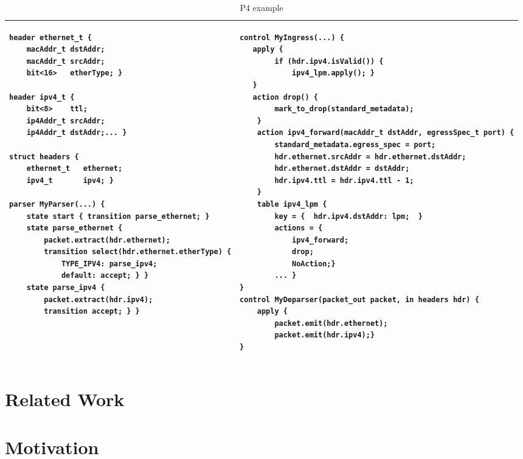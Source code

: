 \documentclass[sigconf]{acmart}
\begin{document}
\begin{table*}
\begin{tabular}{|p{8.4cm}|p{8.4cm}|}
\hline
\begin{lstlisting}[basicstyle=\scriptsize]
header ethernet_t {
    macAddr_t dstAddr;
    macAddr_t srcAddr;
    bit<16>   etherType; }
    
header ipv4_t {
    bit<8>    ttl;
    ip4Addr_t srcAddr;
    ip4Addr_t dstAddr;... }
    
struct headers {
    ethernet_t   ethernet;
    ipv4_t       ipv4; }

parser MyParser(...) {
    state start { transition parse_ethernet; }
    state parse_ethernet {
        packet.extract(hdr.ethernet);
        transition select(hdr.ethernet.etherType) {
            TYPE_IPV4: parse_ipv4;
            default: accept; } }
    state parse_ipv4 {
        packet.extract(hdr.ipv4);
        transition accept; } }
\end{lstlisting}
&
\begin{lstlisting}[basicstyle=\scriptsize]
control MyIngress(...) {
   apply {
        if (hdr.ipv4.isValid()) {
            ipv4_lpm.apply(); }
   }         
   action drop() {
        mark_to_drop(standard_metadata);
    }    
    action ipv4_forward(macAddr_t dstAddr, egressSpec_t port) {
        standard_metadata.egress_spec = port;
        hdr.ethernet.srcAddr = hdr.ethernet.dstAddr;
        hdr.ethernet.dstAddr = dstAddr;
        hdr.ipv4.ttl = hdr.ipv4.ttl - 1;
    }    
    table ipv4_lpm {
        key = {  hdr.ipv4.dstAddr: lpm;  }
        actions = {
            ipv4_forward;
            drop;
            NoAction;}
        ... }   
}
control MyDeparser(packet_out packet, in headers hdr) {
    apply {
        packet.emit(hdr.ethernet);
        packet.emit(hdr.ipv4);}
}
\end{lstlisting}\\
\hline
\end{tabular}
\caption{P4 example}
  \label{code:P4}
\end{table*}	   


	
	\section{Related Work}
	
	\section{Motivation}
	
\end{document}
